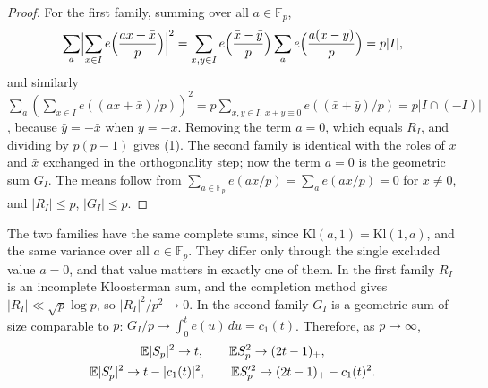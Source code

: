 \begin{proof}
For the first family, summing over all $a\in\mathbb{F}_p$,
\[
\sum_a\Bigl|\sum_{x\in I}e\Bigl(\frac{ax+\bar x}{p}\Bigr)\Bigr|^2=\sum_{x,y\in I}e\Bigl(\frac{\bar x-\bar y}{p}\Bigr)\sum_ae\Bigl(\frac{a(x-y)}{p}\Bigr)=p|I|,
\]
and similarly $\sum_a(\sum_{x\in I}e((ax+\bar x)/p))^2=p\sum_{x,y\in I,\,x+y\equiv0}e((\bar x+\bar y)/p)=p|I\cap(-I)|$, because $\bar y=-\bar x$ when $y=-x$. Removing the term $a=0$, which equals $R_I$, and dividing by $p(p-1)$ gives (1). The second family is identical with the roles of $x$ and $\bar x$ exchanged in the orthogonality step; now the term $a=0$ is the geometric sum $G_I$. The means follow from $\sum_{a\in\mathbb{F}_p}e(a\bar x/p)=\sum_ae(ax/p)=0$ for $x\ne0$, and $|R_I|\le p$, $|G_I|\le p$.
\end{proof}

The two families have the same complete sums, since $\mathrm{Kl}(a,1)=\mathrm{Kl}(1,a)$, and the same variance over all $a\in\mathbb{F}_p$. They differ only through the single excluded value $a=0$, and that value matters in exactly one of them. In the first family $R_I$ is an incomplete Kloosterman sum, and the completion method gives $|R_I|\ll\sqrt p\log p$, so $|R_I|^2/p^2\to0$. In the second family $G_I$ is a geometric sum of size comparable to $p$: $G_I/p\to\int_0^te(u)\,du=c_1(t)$. Therefore, as $p\to\infty$,
\begin{gather*}
\mathbb{E}|S_p|^2\to t,\qquad\mathbb{E} S_p^2\to(2t-1)_+,\\
\mathbb{E}|S'_p|^2\to t-|c_1(t)|^2,\qquad\mathbb{E} S_p'^2\to(2t-1)_+-c_1(t)^2 .
\end{gather*}

